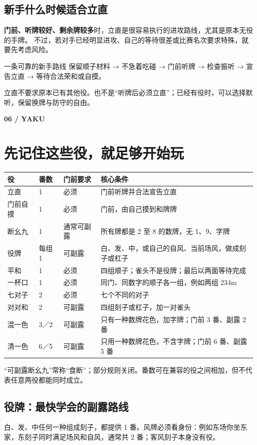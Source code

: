 \documentclass[UTF8,a4paper,zihao=5,fontset=fandol]{ctexart}
\newcommand{\pageintro}[3]{\clearpage\phantomsection\label{#1}
 {\small\sffamily\bfseries\color{gold}#2}\par\vspace{2pt}\section{#3}}
\newcommand{\smalltext}[1]{{\small\color{muted}#1}}
\newcommand{\notation}[1]{{\ttfamily\color{teal}#1}}
\begin{document}
\subsection{新手什么时候适合立直}
\textbf{门前、听牌较好、剩余牌较多}时，立直是很容易执行的进攻路线，尤其是原本无役的手牌。
不过，若对手已经明显进攻、自己的等待很差或比赛名次要求特殊，就要先考虑风险。

\begin{example}{一条可靠的新手路线}
保留顺子材料 → 不急着吃碰 → 门前听牌 → 检查振听 → 宣告立直 → 等待合法荣和或自摸。
\end{example}
\smalltext{立直不要求原本已有其他役。也不是“听牌后必须立直”；已经有役时，可以选择默听，保留换牌与防守的自由。}

\pageintro{yaku}{06 / YAKU}{先记住这些役，就足够开始玩}
\par\noindent\begin{tabularx}{\linewidth}{L{20mm}L{13mm}L{18mm}Y}
\toprule
役 & 番数 & 门前要求 & 核心条件\\
\midrule
立直 & 1 & 必须 & 门前听牌并合法宣告立直\\
门前自摸 & 1 & 必须 & 门前，由自己摸到和牌牌\\
断幺九 & 1 & 通常可副露 & 所有牌都是 2 至 8 的数牌，无 1、9、字牌\\
役牌 & 每组 1 & 可副露 & 白、发、中，或自己的自风、当前场风，做成刻子或杠子\\
平和 & 1 & 必须 & 四组顺子；雀头不是役牌；最后以两面等待完成\\
一杯口 & 1 & 必须 & 同门、同数字的顺子各一组，例如两组 \notation{234m}\\
七对子 & 2 & 必须 & 七个不同的对子\\
对对和 & 2 & 可副露 & 四组刻子或杠子，加一对雀头\\
混一色 & 3／2 & 可副露 & 只有一种数牌花色，加字牌；门前 3 番、副露 2 番\\
清一色 & 6／5 & 可副露 & 只用一种数牌花色，不含字牌；门前 6 番、副露 5 番\\
\bottomrule
\end{tabularx}\par\vspace{3pt}
\smalltext{“可副露断幺九”常称“食断”；部分规则关闭。番数可在兼容的役之间相加，但不代表任意两役都能同时成立。}

\subsection{役牌：最快学会的副露路线}
白、发、中任何一种组成刻子，都提供 1 番。风牌必须看身份：例如东场你坐东家，东刻子同时满足场风和自风，通常共 2 番；客风刻子本身没有役。
\end{document}
